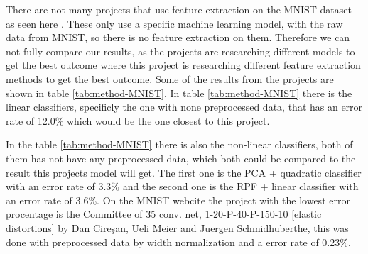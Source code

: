 There are not many projects that use feature extraction on the MNIST dataset as seen here \cite{Stochastic-optimization-neural-networks-assiri} \cite{BYERLY2021545} \cite{convolutional-neural-networks-convnets} \cite{Multi-column-neural-network-ciregan} \cite{WaveMix-jeevan}. These only use a specific machine learning model, with the raw data from MNIST, so there is no feature extraction on them. Therefore we can not fully compare our results, as the projects are researching different models to get the best outcome where this project is researching different feature extraction methods to get the best outcome. Some of the results from the projects are shown in table \ref{tab:method-MNIST}.
In table \ref{tab:method-MNIST} there is the linear classifiers, specificly the one with none preprocessed data, that has an error rate of 12.0\% which would be the one closest to this project. 

In the table \ref{tab:method-MNIST} there is also the non-linear classifiers, both of them has not have any preprocessed data, which both could be compared to the result this projects model will get. The first one is the PCA + quadratic classifier with an error rate of 3.3\% and the second one is the RPF + linear classifier with an error rate of 3.6\%. 
On the MNIST webcite \cite{MNIST} the project with the lowest error procentage is the Committee of 35 conv. net, 1-20-P-40-P-150-10 [elastic distortions] by Dan Cireşan, Ueli Meier and Juergen Schmidhuberthe, this was done with preprocessed data by width normalization and a error rate of 0.23\%.








